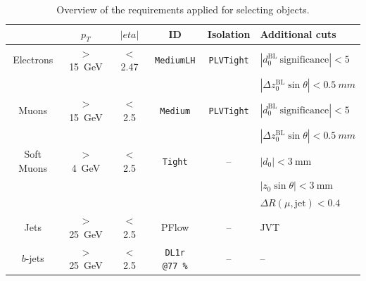 \begin{table}[!h]
	\scriptsize
	\centering
	\begin{tabular}{cccccl}
		\toprule
		& $p_{T}$ & $|eta|$ & ID & Isolation & Additional cuts \\
		\midrule
		Electrons & $>$ \SI{15}{\GeV} & $<$ 2.47 & \texttt{MediumLH} & \texttt{PLVTight}  & $|d_0^\mathrm{BL}~\mathrm{significance} | < 5$ \\
		& & & & & $|\Delta z_0^\mathrm{BL} \sin\theta| < \SI{0.5}{mm}$ \\
		\midrule
		Muons & $>$ \SI{15}{\GeV} & $<$ 2.5 & \texttt{Medium} & \texttt{PLVTight}  & $|d_0^\mathrm{BL}~\mathrm{significance} | < 5$ \\
		& & & & & $|\Delta z_0^\mathrm{BL} \sin\theta| < \SI{0.5}{mm}$ \\
		\midrule
		Soft Muons & $>$ \SI{4}{\GeV} & $<$ 2.5 & \texttt{Tight} & -- & $|d_0| < \SI{3}{\milli\metre}$ \\
		& & & & & $|z_0 \sin\theta| < \SI{3}{\milli\metre}$ \\
		& & & & & $\Delta R(\mu,\mathrm{jet}) < 0.4$ \\
		\midrule
		Jets & $>$ \SI{25}{\GeV} & $<$ 2.5 & PFlow & --  & JVT \\
		\midrule
		$b$-jets & $>$ \SI{25}{\GeV} & $<$ 2.5 & \texttt{DL1r @\SI{77}{\%}} & --  & --\\
		\bottomrule
	\end{tabular}
	\caption{\normalsize{Overview of the requirements applied for selecting objects.}}
	\label{tab:objects}
\end{table}


\FloatBarrier
